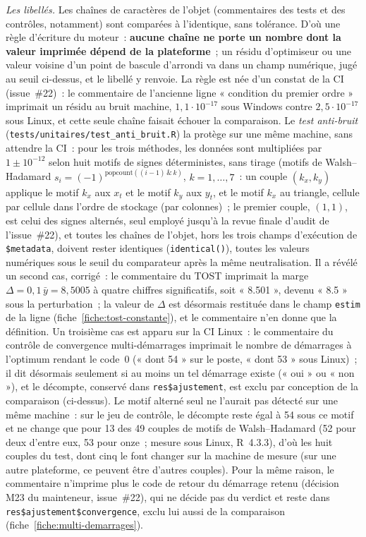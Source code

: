 \documentclass[a4paper,11pt]{article}
\newcommand{\code}[1]{\texttt{\small #1}}
\begin{document}
\emph{Les libellés.} Les chaînes de caractères de l'objet (commentaires des tests et des
contrôles, notamment) sont comparées à l'identique, sans tolérance. D'où une règle
d'écriture du moteur~: \textbf{aucune chaîne ne porte un nombre dont la valeur imprimée dépend
de la plateforme}~; un résidu d'optimiseur ou une valeur voisine d'un point de bascule
d'arrondi va dans un champ numérique, jugé au seuil ci-dessus, et le libellé y renvoie. La règle
est née d'un constat de la CI (issue~\#22)~: le commentaire de l'ancienne ligne « condition du
premier ordre » imprimait un résidu au bruit machine, $1{,}1\cdot 10^{-17}$ sous Windows contre
$2{,}5\cdot 10^{-17}$ sous Linux, et cette seule chaîne faisait échouer la comparaison. Le
\emph{test anti-bruit} (\code{tests/unitaires/test\_anti\_bruit.R}) la protège sur une même
machine, sans attendre la CI~: pour les trois méthodes, les données sont multipliées par
$1 \pm 10^{-12}$ selon huit motifs de signes déterministes, sans tirage (motifs de
Walsh--Hadamard $s_i = (-1)^{\mathrm{popcount}((i-1)\,\&\,k)}$, $k = 1, \dots, 7$~: un
couple $(k_x, k_y)$ applique le motif $k_x$ aux $x_t$ et le motif $k_y$ aux $y_t$, et le motif
$k_x$ au triangle, cellule par cellule dans l'ordre de stockage (par colonnes)~; le premier couple, $(1, 1)$,
est celui des signes alternés, seul employé jusqu'à la revue finale d'audit de l'issue~\#22),
et toutes les
chaînes de l'objet, hors les
trois champs d'exécution de \code{\$metadata}, doivent rester
identiques (\code{identical()}), toutes les valeurs numériques sous le seuil du comparateur
après la même neutralisation. Il a révélé un second cas, corrigé~: le commentaire du TOST
imprimait la marge $\Delta = 0{,}1\,\bar y = 8{,}5005$ à quatre chiffres significatifs, soit
« 8.501 », devenu « 8.5 » sous la perturbation~; la valeur de $\Delta$ est désormais restituée
dans le champ \code{estim} de la ligne (fiche~\ref{fiche:tost-constante}), et le commentaire n'en
donne que la définition. Un troisième cas est apparu sur la CI Linux~: le commentaire du contrôle
de convergence multi-démarrages imprimait le nombre de démarrages à l'optimum rendant le code~0
(« dont 54 » sur le poste, « dont 53 » sous Linux)~; il dit désormais seulement si au moins un
tel démarrage existe (« oui » ou « non »), et le décompte, conservé dans \code{res\$ajustement},
est exclu par conception de la comparaison (ci-dessus). Le motif alterné seul ne l'aurait pas
détecté sur une même machine~: sur le jeu de contrôle, le décompte reste égal à 54 sous ce motif
et ne change que pour 13 des 49 couples de motifs de Walsh--Hadamard (52 pour deux d'entre
eux, 53 pour onze~; mesure sous Linux, R~4.3.3), d'où les huit couples du test, dont cinq le font changer sur la machine
de mesure (sur une autre plateforme, ce peuvent être d'autres couples). Pour la même raison, le
commentaire n'imprime plus le code de retour du démarrage retenu (décision M23 du mainteneur,
issue~\#22), qui ne décide pas du verdict et reste dans \code{res\$ajustement\$convergence},
exclu lui aussi de la comparaison (fiche~\ref{fiche:multi-demarrages}).
\end{document}
